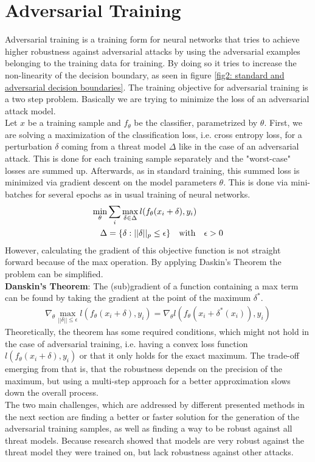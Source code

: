 \documentclass{article}
\begin{document}
\section{Adversarial Training}
  
Adversarial training is a training form for neural networks that tries to achieve higher robustness against adversarial attacks by using the adversarial examples belonging to the training data for training. By doing so it tries to increase the non-linearity of the decision boundary, as seen in figure \ref{fig2: standard and adversarial decision boundaries}. The training objective for adversarial training is a two step problem. Basically we are trying to minimize the loss of an adversarial attack model. \\
Let $x$ be a training sample and $f_{\theta}$ be the classifier, parametrized by $\theta$. First, we are solving a maximization of the classification loss, i.e. cross entropy loss, for a perturbation $\delta$ coming from a threat model $\Delta$ like in the case of an adversarial attack. This is done for each training sample separately and the "worst-case" losses are summed up. Afterwards, as in standard training, this summed loss is minimized via gradient descent on the model parameters $\theta$. This is done via mini-batches for several epochs as in usual training of neural networks.
\vspace{-0.2cm}
\begin{align}
  \label{eqn:saddle}
  \min_{\theta} & \sum_i \max_{\delta \in \Delta} \space l(f_{\theta}(x_i + \delta), y_i)  \\
  \Delta & = \{\delta : ||\delta||_p \leq \epsilon\} \quad \text{with} \quad \epsilon > 0
\end{align}
However, calculating the gradient of this objective function is not straight forward because of the max operation. By applying Daskin's Theorem the problem can be simplified. \\
\textbf{Danskin's Theorem}: The (sub)gradient of a function containing a max term can be found by taking the gradient at the point of the maximum $\delta^{*}$.
\begin{align*}
  \nabla_{\theta} \max_{||\delta|| \leq \epsilon} l(f_{\theta}(x_i + \delta), y_i) = \nabla_{\theta} l(f_{\theta}(x_i + \delta^{*}(x_i)), y_i)
\end{align*}
Theoretically, the theorem has some required conditions, which might not hold in the case of adversarial training, i.e. having a convex loss function $l(f_{\theta}(x_i + \delta), y_i)$ or that it only holds for the exact maximum. The trade-off emerging from that is, that the robustness depends on the precision of the maximum, but using a multi-step approach for a better approximation slows down the overall process. \\
The two main challenges, which are addressed by different presented methods in the next section are finding a better or faster solution for the generation of the adversarial training samples, as well as finding a way to be robust against all threat models. Because research showed that models are very robust against the threat model they were trained on, but lack robustness against other attacks.
  
\end{document}
